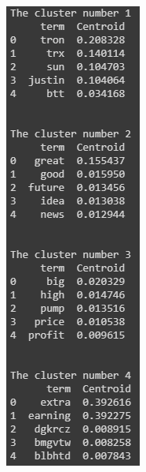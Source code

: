 \documentclass[a4paper, 12pt]{article}
\begin{document}
\begin{figure}[H]
    \centering
    \begin{subfigure}[a]{0.3\textwidth}
        \includegraphics[width=\textwidth]{res/k8.1.png}

\end{subfigure}
\end{figure}
\end{document}
